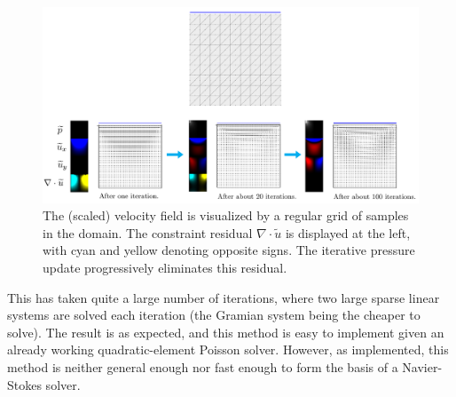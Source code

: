 \begin{figure}[H]
    \centering
    \centerline{\includegraphics[width=1.1\textwidth]{figures/stokes/lid_driven_weakly_incompressible/figure.png}}
    \caption{\tiny
        The (scaled) velocity field is visualized by a regular grid of samples in the domain.
        The constraint residual $\nabla\cdot \widetilde{u}$ is displayed at the left, with cyan and yellow denoting opposite signs. The iterative pressure update
        progressively eliminates this residual.
    }
    \label{stokes_lid_driven_weakly_incomprssible}
\end{figure}

This has taken quite a large number of iterations, where two large sparse linear systems are solved each iteration (the Gramian system being the cheaper to solve).
The result is as expected, and this method is easy to implement given an already working quadratic-element Poisson solver.
However, as implemented, this method is neither general enough nor fast enough to form the basis of a Navier-Stokes solver.



